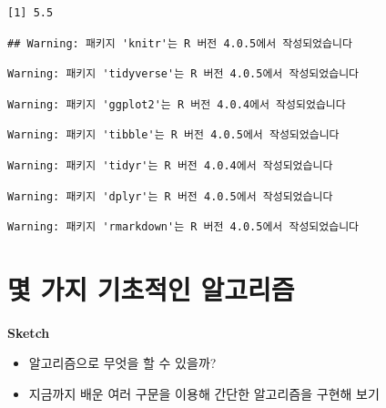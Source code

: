 \documentclass[
  11pt,
]{krantz}
\makeatletter
\providecommand{\tightlist}{%
  \setlength{\itemsep}{0pt}\setlength{\parskip}{0pt}}
\newenvironment{kframe}{%
\medskip{}
\setlength{\fboxsep}{.8em}
 \def\at@end@of@kframe{}%
 \ifinner\ifhmode%
  \def\at@end@of@kframe{\end{minipage}}%
  \begin{minipage}{\columnwidth}%
 \fi\fi%
 \def\FrameCommand##1{\hskip\@totalleftmargin \hskip-\fboxsep
 \colorbox{shadecolor}{##1}\hskip-\fboxsep
     \hskip-\linewidth \hskip-\@totalleftmargin \hskip\columnwidth}%
 \MakeFramed {\advance\hsize-\width
   \@totalleftmargin\z@ \linewidth\hsize
   \@setminipage}}%
 {\par\unskip\endMakeFramed%
 \at@end@of@kframe}
\renewenvironment{quote}{\begin{kframe}}{\end{kframe}}
\makeatother
\begin{document}
\begin{verbatim}
[1] 5.5
\end{verbatim}

\normalsize

\begin{verbatim}
## Warning: 패키지 'knitr'는 R 버전 4.0.5에서 작성되었습니다
\end{verbatim}

\footnotesize

\begin{verbatim}
Warning: 패키지 'tidyverse'는 R 버전 4.0.5에서 작성되었습니다
\end{verbatim}

\begin{verbatim}
Warning: 패키지 'ggplot2'는 R 버전 4.0.4에서 작성되었습니다
\end{verbatim}

\begin{verbatim}
Warning: 패키지 'tibble'는 R 버전 4.0.5에서 작성되었습니다
\end{verbatim}

\begin{verbatim}
Warning: 패키지 'tidyr'는 R 버전 4.0.4에서 작성되었습니다
\end{verbatim}

\begin{verbatim}
Warning: 패키지 'dplyr'는 R 버전 4.0.5에서 작성되었습니다
\end{verbatim}

\begin{verbatim}
Warning: 패키지 'rmarkdown'는 R 버전 4.0.5에서 작성되었습니다
\end{verbatim}

\normalsize

\hypertarget{uxba87-uxac00uxc9c0-uxae30uxcd08uxc801uxc778-uxc54cuxace0uxb9acuxc998}{%
\chapter{몇 가지 기초적인 알고리즘}\label{uxba87-uxac00uxc9c0-uxae30uxcd08uxc801uxc778-uxc54cuxace0uxb9acuxc998}}

\begin{quote}
\textbf{Sketch}

\begin{itemize}
\tightlist
\item
  알고리즘으로 무엇을 할 수 있을까?
\item
  지금까지 배운 여러 구문을 이용해 간단한 알고리즘을 구현해 보기
\end{itemize}
\end{quote}
\end{document}
